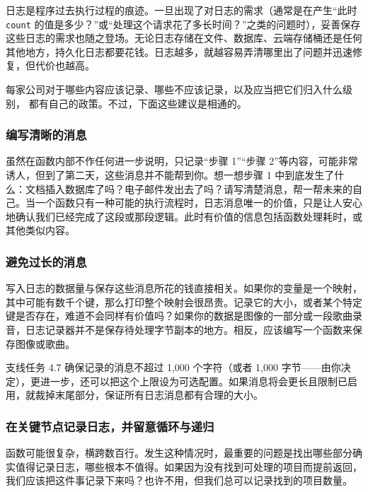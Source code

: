 日志是程序过去执行过程的痕迹。一旦出现了对日志的需求（通常是在产生“此时 \texttt{count} 的值是多少？”或“处理这个请求花了多长时间？”之类的问题时），妥善保存这些日志的需求也随之登场。无论日志存储在文件、数据库、云端存储桶还是任何其他地方，持久化日志都要花钱。日志越多，就越容易弄清哪里出了问题并迅速修复，但代价也越高。

每家公司对于哪些内容应该记录、哪些不应该记录，以及应当把它们归入什么级别，
都有自己的政策。不过，下面这些建议是相通的。

\subsubsection*{编写清晰的消息}

虽然在函数内部不作任何进一步说明，只记录“步骤 1”“步骤 2”等内容，可能非常诱人，但到了第二天，这些消息并不能帮到你。想一想步骤 1 中到底发生了什么：文档插入数据库了吗？电子邮件发出去了吗？请写清楚消息，帮一帮未来的自己。当一个函数只有一种可能的执行流程时，日志消息唯一的价值，只是让人安心地确认我们已经完成了这段或那段逻辑。此时有价值的信息包括函数处理耗时，或其他类似内容。

\subsubsection*{避免过长的消息}

写入日志的数据量与保存这些消息所花的钱直接相关。如果你的变量是一个映射，其中可能有数千个键，那么打印整个映射会很昂贵。记录它的大小，或者某个特定键是否存在，难道不会同样有价值吗？如果你的数据是图像的一部分或一段歌曲录音，日志记录器并不是保存待处理字节副本的地方。相反，应该编写一个函数来保存图像或歌曲。

\begin{infobox}{支线任务 4.7}
确保记录的消息不超过 1,000 个字符（或者 1,000 字节——由你决定），更进一步，还可以把这个上限设为可选配置。如果消息将会更长且限制已启用，就裁掉末尾部分，保证所有日志消息都有合理的大小。
\end{infobox}

\subsubsection*{在关键节点记录日志，并留意循环与递归}

函数可能很复杂，横跨数百行。发生这种情况时，最重要的问题是找出哪些部分确实值得记录日志，哪些根本不值得。如果因为没有找到可处理的项目而提前返回，我们应该把这件事记录下来吗？也许不用，但我们总可以记录找到的项目数量。

